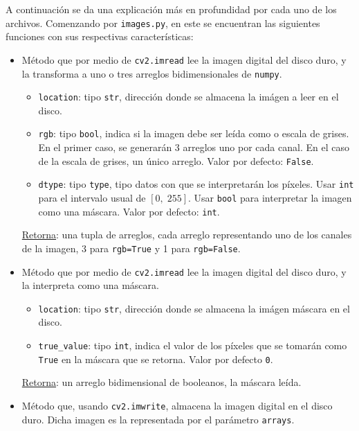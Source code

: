 A continuaci\'on se da una explicaci\'on m\'as en profundidad por cada uno de los archivos. Comenzando por \texttt{images.py}, en este se encuentran las siguientes funciones con sus respectivas características:
\begin{itemize}
	\item M\'etodo que por medio de \texttt{cv2.imread} lee la imagen digital del disco duro, y la transforma a uno o tres arreglos bidimensionales de \texttt{numpy}.
	
	\begin{itemize}
		\item \texttt{location}: tipo \texttt{str}, direcci\'on donde se almacena la im\'agen a leer en el disco.
		\item \texttt{rgb}: tipo \texttt{bool}, indica si la imagen debe ser le\'ida como \RGB o escala de grises. En el primer caso, se generar\'an 3 arreglos uno por cada canal. En el caso de la escala de grises, un \'unico arreglo. Valor por defecto: \texttt{False}.
		\item \texttt{dtype}: tipo \texttt{type}, tipo datos con que se interpretar\'an los p\'ixeles. Usar \texttt{int} para el intervalo usual de $[0,\; 255]$. Usar \texttt{bool} para interpretar la imagen como una m\'ascara. Valor por defecto: \texttt{int}.
	\end{itemize}
	\underline{Retorna}: una tupla de arreglos, cada arreglo representando uno de los canales de la imagen, 3 para \texttt{rgb=True} y 1 para \texttt{rgb=False}.
	
	\item M\'etodo que por medio de \texttt{cv2.imread} lee la imagen digital del disco duro, y la interpreta como una m\'ascara.
	
	\begin{itemize}
		\item \texttt{location}: tipo \texttt{str}, direcci\'on donde se almacena la im\'agen m\'ascara en el disco.
		\item \texttt{true\_value}: tipo \texttt{int}, indica el valor de los p\'ixeles que se tomar\'an como \texttt{True} en la m\'ascara que se retorna. Valor por defecto \texttt{0}.
	\end{itemize}
	\underline{Retorna}: un arreglo bidimensional de booleanos, la m\'ascara leída.
	
	\item 	M\'etodo que, usando \texttt{cv2.imwrite}, almacena la imagen digital en el disco duro. Dicha imagen es la representada por el par\'ametro \texttt{arrays}.
	

\end{itemize}
